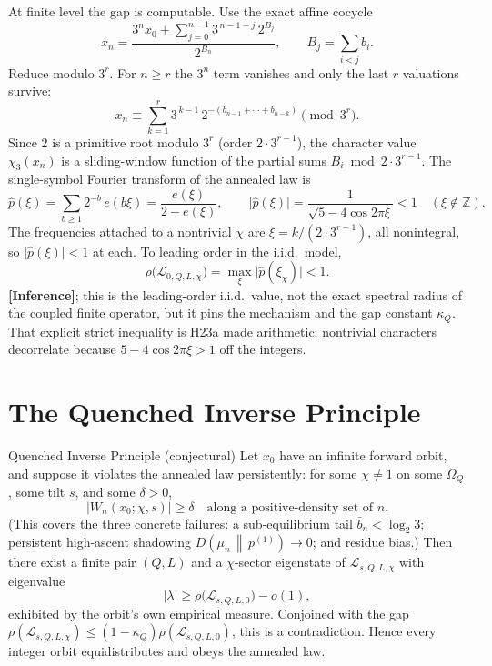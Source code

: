 \documentclass[11pt]{article}
\newcommand{\Z}{\mathbb{Z}}
\newcommand{\Lcal}{\mathcal{L}}
\newcommand{\Om}{\Omega}
\newcommand{\KL}[2]{D\!\left(#1\,\middle\|\,#2\right)}
\newcommand{\epi}[1]{{\small\sffamily\textbf{[#1]}}}
\theoremstyle{remark}
\begin{document}
At finite level the gap is computable. Use the exact affine cocycle
\[
x_n = \frac{3^n x_0 + \sum_{j=0}^{n-1} 3^{\,n-1-j}\, 2^{B_j}}{2^{B_n}},
\qquad B_j = \sum_{i<j} b_i .
\]
Reduce modulo $3^r$. For $n\ge r$ the $3^n$ term vanishes and only the last $r$ valuations
survive:
\[
x_n \equiv \sum_{k=1}^{r} 3^{\,k-1}\, 2^{-(b_{n-1} + \cdots + b_{n-k})} \pmod{3^r}.
\]
Since $2$ is a primitive root modulo $3^r$ (order $2\cdot 3^{r-1}$), the character value
$\chi_3(x_n)$ is a sliding-window function of the partial sums $B_i \bmod 2\cdot 3^{r-1}$.
The single-symbol Fourier transform of the annealed law is
\[
\hat p(\xi) = \sum_{b\ge1} 2^{-b}\, e(b\xi) = \frac{e(\xi)}{2 - e(\xi)},
\qquad
\lvert \hat p(\xi)\rvert = \frac{1}{\sqrt{5 - 4\cos 2\pi\xi}} < 1
\quad (\xi\notin\Z).
\]
The frequencies attached to a nontrivial $\chi$ are $\xi = k/(2\cdot 3^{r-1})$, all
nonintegral, so $\lvert\hat p(\xi)\rvert < 1$ at each. To leading order in the
i.i.d.\ model,
\[
\rho\bigl(\Lcal_{0,Q,L,\chi}\bigr) = \max_\xi \lvert\hat p(\xi_\chi)\rvert < 1.
\]
\epi{Inference}; this is the leading-order i.i.d.\ value, not the exact spectral radius of
the coupled finite operator, but it pins the mechanism and the gap constant $\kappa_Q$.
That explicit strict inequality is \textsf{H23a} made arithmetic: nontrivial characters
decorrelate because $5 - 4\cos 2\pi\xi > 1$ off the integers.

\section{The Quenched Inverse Principle}

\begin{principlebox}{Quenched Inverse Principle (conjectural)}
Let $x_0$ have an infinite forward orbit, and suppose it violates the annealed law
persistently: for some $\chi\ne 1$ on some $\Om_Q$, some tilt $s$, and some $\delta>0$,
\[
\lvert W_n(x_0;\chi,s)\rvert \ge \delta
\quad\text{along a positive-density set of } n .
\]
(This covers the three concrete failures: a sub-equilibrium tail $\bar b_n < \log_2 3$;
persistent high-ascent shadowing $\KL{\mu_n}{p^{(1)}}\to 0$; and residue bias.) Then there
exist a finite pair $(Q,L)$ and a $\chi$-sector eigenstate of $\Lcal_{s,Q,L,\chi}$ with
eigenvalue
\[
\lvert\lambda\rvert \ge \rho\bigl(\Lcal_{s,Q,L,0}\bigr) - o(1),
\]
exhibited by the orbit's own empirical measure. Conjoined with the gap
$\rho(\Lcal_{s,Q,L,\chi}) \le (1-\kappa_Q)\rho(\Lcal_{s,Q,L,0})$, this is a contradiction.
Hence every integer orbit equidistributes and obeys the annealed law.
\end{principlebox}
\end{document}
